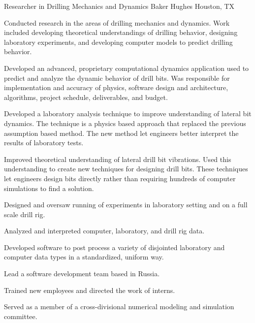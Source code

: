 \documentclass{resume}
\begin{document}
            {Researcher in Drilling Mechanics and Dynamics}
            {Baker Hughes}
			{Houston, TX}
			
					\noindent 
				Conducted research in the areas of drilling mechanics and dynamics.  Work included developing theoretical understandings of drilling behavior, designing laboratory experiments, and developing computer models to predict drilling behavior.
			
		\begin{bulletedlist}
			
		\item 
					Developed an advanced, proprietary computational dynamics application used to predict and analyze the dynamic behavior of drill bits.  Was responsible for implementation and accuracy of physics, software design and architecture, algorithms, project schedule, deliverables, and budget.
				
		\item Developed a laboratory analysis technique to improve understanding of lateral bit dynamics.  The technique is a physics based approach that replaced the previous assumption based method.  The new method let engineers better interpret the results of laboratory tests.
		\item Improved theoretical understanding of lateral drill bit vibrations.  Used this understanding to create new techniques for designing drill bits.  These techniques let engineers design bits directly rather than requiring hundreds of computer simulations to find a solution.
		\item Designed and oversaw running of experiments in laboratory setting and on a full scale drill rig.
		\item Analyzed and interpreted computer, laboratory, and drill rig data.
		\item Developed software to post process a variety of disjointed laboratory and computer data types in a standardized, uniform way.
		\item Lead a software development team based in Russia.
		\item Trained new employees and directed the work of interns.
		\item Served as a member of a cross-divisional numerical modeling and simulation committee.
		\end{bulletedlist}
			\vspace*{-12pt}
	\hspace*{0pt}\\ \vspace*{-2pt}
				
\end{document}
